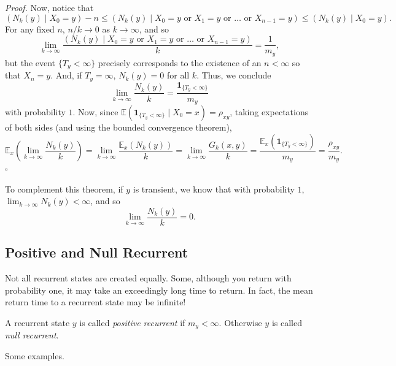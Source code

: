 \documentclass{problemset}
\newcommand{\E}{\mathbb{E}}
\newcommand{\1}{\mathbf{1}}
\newenvironment{proof}{\emph{Proof.}}{\hfill$\square$}
\begin{document}
\begin{proof}
		Now, notice that 
		\[
			(N_{k}(y)\mid X_0=y) -n \leq (N_{k}(y)\mid X_0=y\text{ or }X_1=y\text{ or \ldots\ or } X_{n-1}=y) \leq (N_{k}(y)\mid X_0=y).
		\]
		For any fixed $n$, $n/k\to0$ as $k\to\infty$, and so
		\[
			\lim_{k\to\infty} \frac{(N_{k}(y)\mid X_0=y\text{ or }X_1=y\text{ or \ldots\ or } X_{n-1}=y)}{k} = 
			\frac{1}{m_y},
		\]
		but the event $\{T_y<\infty\}$ precisely
		corresponds to the existence of an $n<\infty$ so that $X_n=y$. And, if $T_y=\infty$, $N_k(y)=0$ for all $k$.
		Thus, we conclude
		\[
			\lim_{k\to\infty} \frac{N_{k}(y)}{k} = 
			\frac{\1_{\{T_y<\infty\}}}{m_y}
		\]
		with probability $1$.  Now, since $\E(\1_{\{T_y<\infty\}}\mid X_0=x)=\rho_{xy}$, taking expectations
		of both sides (and using the bounded convergence theorem),
		\[
			\E_x\left(\lim_{k\to\infty} \frac{N_{k}(y)}{k}\right)
			=\lim_{k\to\infty} \frac{\E_x(N_{k}(y))}{k}
			=\lim_{k\to\infty} \frac{G_k(x,y)}{k}
			=\frac{\E_x(\1_{\{T_y<\infty\}})}{m_y} = \frac{\rho_{xy}}{m_y}.
		\]
	\end{proof}

	To complement this theorem, if $y$ is transient, we know that with probability $1$, $\lim_{k\to\infty} N_k(y) <\infty$,
	and so
	\[
		\lim_{k\to\infty} \frac{N_{k}(y)}{k} = 
		0.
	\]

	\subsection*{Positive and Null Recurrent}

	Not all recurrent states are created equally.  Some, although you return with
	probability one, it may take an exceedingly long time to return.  In fact, 
	the mean return time to a recurrent state may be infinite!

	\begin{definition}
		A recurrent state $y$ is called \emph{positive recurrent} if
		$m_y<\infty$.  Otherwise $y$ is called \emph{null recurrent}.
	\end{definition}

	Some examples.
\end{document}
